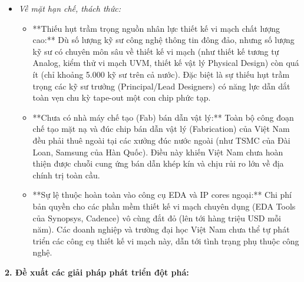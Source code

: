 \documentclass[12pt,a4paper]{article}
\begin{document}
{\begin{itemize}
\begin{itemize}
    \end{itemize}
    \item \textit{Về mặt hạn chế, thách thức:}
    \begin{itemize}
        \item **Thiếu hụt trầm trọng nguồn nhân lực thiết kế vi mạch chất lượng cao:** Dù số lượng kỹ sư công nghệ thông tin đông đảo, nhưng số lượng kỹ sư có chuyên môn sâu về thiết kế vi mạch (như thiết kế tương tự Analog, kiểm thử vi mạch UVM, thiết kế vật lý Physical Design) còn quá ít (chỉ khoảng 5.000 kỹ sư trên cả nước). Đặc biệt là sự thiếu hụt trầm trọng các kỹ sư trưởng (Principal/Lead Designers) có năng lực dẫn dắt toàn vẹn chu kỳ tape-out một con chip phức tạp.
        \item **Chưa có nhà máy chế tạo (Fab) bán dẫn vật lý:** Toàn bộ công đoạn chế tạo mặt nạ và đúc chip bán dẫn vật lý (Fabrication) của Việt Nam đều phải thuê ngoài tại các xưởng đúc nước ngoài (như TSMC của Đài Loan, Samsung của Hàn Quốc). Điều này khiến Việt Nam chưa hoàn thiện được chuỗi cung ứng bán dẫn khép kín và chịu rủi ro lớn về địa chính trị toàn cầu.
        \item **Sự lệ thuộc hoàn toàn vào công cụ EDA và IP cores ngoại:** Chi phí bản quyền cho các phần mềm thiết kế vi mạch chuyên dụng (EDA Tools của Synopsys, Cadence) vô cùng đắt đỏ (lên tới hàng triệu USD mỗi năm). Các doanh nghiệp và trường đại học Việt Nam chưa thể tự phát triển các công cụ thiết kế vi mạch này, dẫn tới tình trạng phụ thuộc công nghệ.
    \end{itemize}
\end{itemize}

\noindent
\textbf{2. Đề xuất các giải pháp phát triển đột phá:}

}
\end{document}
